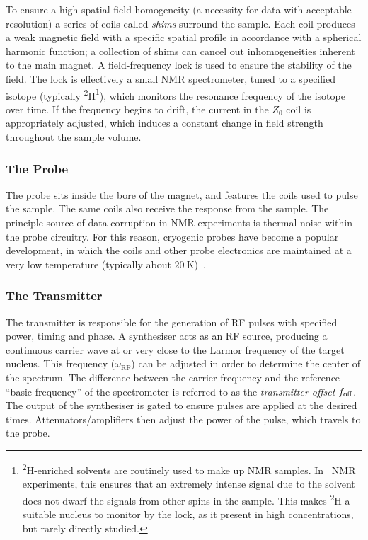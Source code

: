 To ensure a high spatial field homogeneity (a necessity for data with
acceptable resolution) a series of coils called \textit{shims} surround the
sample. Each coil produces a weak magnetic field with a specific spatial
profile in accordance with a spherical harmonic function; a collection of shims
can cancel out inhomogeneities inherent to the main magnet.
A field-frequency lock is used to ensure the stability of the
field. The lock is effectively a small \ac{NMR} spectrometer, tuned to a
specified isotope (typically \textsuperscript{2}H\footnote{
    \textsuperscript{2}H-enriched solvents are routinely used to make up
    \ac{NMR} samples. In \proton\ \ac{NMR} experiments, this ensures that an
    extremely intense signal due to the solvent does not dwarf the signals from
    other spins in the sample. This makes \textsuperscript{2}H a suitable
    nucleus to monitor by the lock, as it present in high concentrations, but
    rarely directly studied.
}), which monitors the resonance frequency of the isotope over
time. If the frequency begins to drift, the current in the $Z_0$ coil is
appropriately adjusted, which induces a constant change in field strength
throughout the sample volume.

\subsubsection{The Probe}
The probe sits inside the bore of the magnet, and features the coils used to
pulse the sample.
The same coils also receive the response from the sample. The principle source
of data corruption in \ac{NMR} experiments is thermal noise within the probe
circuitry.  For this reason, cryogenic probes have become a popular
development, in which the coils and other probe electronics are maintained at a
very low temperature (typically about $\qty{20}{\kelvin}$)~\cite{Kovacs2020}.

\subsubsection{The Transmitter}
The transmitter is responsible for the generation of \ac{RF} pulses
with specified power, timing and phase.
A synthesiser acts as an \ac{RF} source, producing a continuous carrier wave at
or very close to the Larmor frequency of the target nucleus. This frequency
($\omega_{\text{RF}}$) can be adjusted in order to determine the center of the
spectrum. The difference between the carrier frequency and the reference
``basic frequency'' of the spectrometer is referred to as the \emph{transmitter
offset} $f_{\text{off}}$.  The output of the synthesiser is gated to ensure pulses are
applied at the desired times. Attenuators/amplifiers then adjust the power
of the pulse, which travels to the probe.

